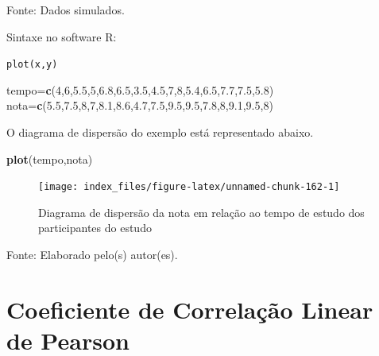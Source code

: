 \documentclass[12pt,brazil,oneside]{book}
\newenvironment{Shaded}{\begin{snugshade}}{\end{snugshade}}
\newcommand{\DecValTok}[1]{\textcolor[rgb]{0.00,0.00,0.81}{#1}}
\newcommand{\FloatTok}[1]{\textcolor[rgb]{0.00,0.00,0.81}{#1}}
\newcommand{\KeywordTok}[1]{\textcolor[rgb]{0.13,0.29,0.53}{\textbf{#1}}}
\newcommand{\NormalTok}[1]{#1}
\begin{document}
Fonte: Dados simulados.

Sintaxe no software R:

\texttt{plot(x,y)}

\begin{Shaded}
\begin{Highlighting}[]
\NormalTok{tempo=}\KeywordTok{c}\NormalTok{(}\DecValTok{4}\NormalTok{,}\DecValTok{6}\NormalTok{,}\FloatTok{5.5}\NormalTok{,}\DecValTok{5}\NormalTok{,}\FloatTok{6.8}\NormalTok{,}\FloatTok{6.5}\NormalTok{,}\FloatTok{3.5}\NormalTok{,}\FloatTok{4.5}\NormalTok{,}\DecValTok{7}\NormalTok{,}\DecValTok{8}\NormalTok{,}\FloatTok{5.4}\NormalTok{,}\FloatTok{6.5}\NormalTok{,}\FloatTok{7.7}\NormalTok{,}\FloatTok{7.5}\NormalTok{,}\FloatTok{5.8}\NormalTok{)}
\NormalTok{nota=}\KeywordTok{c}\NormalTok{(}\FloatTok{5.5}\NormalTok{,}\FloatTok{7.5}\NormalTok{,}\DecValTok{8}\NormalTok{,}\DecValTok{7}\NormalTok{,}\FloatTok{8.1}\NormalTok{,}\FloatTok{8.6}\NormalTok{,}\FloatTok{4.7}\NormalTok{,}\FloatTok{7.5}\NormalTok{,}\FloatTok{9.5}\NormalTok{,}\FloatTok{9.5}\NormalTok{,}\FloatTok{7.8}\NormalTok{,}\DecValTok{8}\NormalTok{,}\FloatTok{9.1}\NormalTok{,}\FloatTok{9.5}\NormalTok{,}\DecValTok{8}\NormalTok{)}
\end{Highlighting}
\end{Shaded}

O diagrama de dispersão do exemplo está representado abaixo.

\begin{Shaded}
\begin{Highlighting}[]
\KeywordTok{plot}\NormalTok{(tempo,nota)}
\end{Highlighting}
\end{Shaded}

\begin{figure}[H]

{\centering \texttt{[image: index\_files/figure-latex/unnamed-chunk-162-1]} 

}

\caption{Diagrama de dispersão da nota em relação ao tempo de estudo dos participantes do estudo}\label{fig:unnamed-chunk-162}
\end{figure}

Fonte: Elaborado pelo(s) autor(es).

\hypertarget{coeficiente-de-correlacao-linear-de-pearson}{%
\section{Coeficiente de Correlação Linear de Pearson}\label{coeficiente-de-correlacao-linear-de-pearson}}
\end{document}
